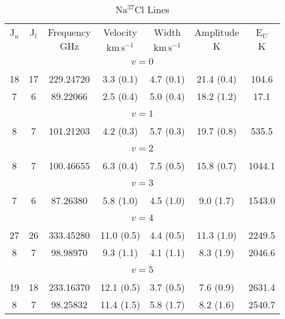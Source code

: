 \begin{table*}[htp]
\centering
\caption{Na$^{37}$Cl Lines}
\begin{tabular}{ccccccc}
\label{tab:Na37Cl_salt_lines}
 J$_u$ & J$_l$ & Frequency & Velocity & Width & Amplitude & E$_U$ \\
  &  & $\mathrm{GHz}$ & $\mathrm{km\,s^{-1}}$ & $\mathrm{km\,s^{-1}}$ & $\mathrm{K}$ & $\mathrm{K}$ \\
\hline
&\vspace{-0.75em}\\
\multicolumn{7}{c}{$v = 0$} \\
\vspace{-0.75em}\\
 18 & 17 & 229.24720 & 3.3 (0.1) & 4.7 (0.1) & 21.4 (0.4) & 104.6 \\
 7 & 6 & 89.22066 & 2.5 (0.4) & 5.0 (0.4) & 18.2 (1.2) & 17.1 \\
&\vspace{-0.75em}\\
\multicolumn{7}{c}{$v = 1$} \\
\vspace{-0.75em}\\
 8 & 7 & 101.21203 & 4.2 (0.3) & 5.7 (0.3) & 19.7 (0.8) & 535.5 \\
&\vspace{-0.75em}\\
\multicolumn{7}{c}{$v = 2$} \\
\vspace{-0.75em}\\
 8 & 7 & 100.46655 & 6.3 (0.4) & 7.5 (0.5) & 15.8 (0.7) & 1044.1 \\
&\vspace{-0.75em}\\
\multicolumn{7}{c}{$v = 3$} \\
\vspace{-0.75em}\\
 7 & 6 & 87.26380 & 5.8 (1.0) & 4.5 (1.0) & 9.0 (1.7) & 1543.0 \\
&\vspace{-0.75em}\\
\multicolumn{7}{c}{$v = 4$} \\
\vspace{-0.75em}\\
 27 & 26 & 333.45280 & 11.0 (0.5) & 4.4 (0.5) & 11.3 (1.0) & 2249.5 \\
 8 & 7 & 98.98970 & 9.3 (1.1) & 4.1 (1.1) & 8.3 (1.9) & 2046.6 \\
&\vspace{-0.75em}\\
\multicolumn{7}{c}{$v = 5$} \\
\vspace{-0.75em}\\
 19 & 18 & 233.16370 & 12.1 (0.5) & 3.7 (0.5) & 7.6 (0.9) & 2631.4 \\
 8 & 7 & 98.25832 & 11.4 (1.5) & 5.8 (1.7) & 8.2 (1.6) & 2540.7 \\
\hline
\end{tabular}

\par 
\end{table*}
